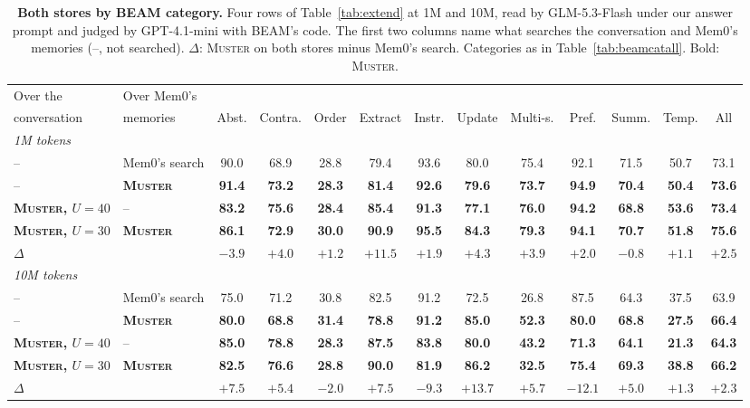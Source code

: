 \documentclass{article}
\newcommand{\ours}{\rowcolor{oursbg}}
\newcommand{\tabfont}{\fontsize{7.5}{8.5}\selectfont\renewcommand{\arraystretch}{1.0}}
\newcommand{\sys}{\textsc{Muster}}
\begin{document}
\begin{table}[H]
\centering\tabfont
\caption{\textbf{Both stores by BEAM category.} Four rows of Table~\ref{tab:extend} at 1M and 10M, read by GLM-5.3-Flash under our answer prompt and judged by GPT-4.1-mini with BEAM's code. The first two columns name what searches the conversation and Mem0's memories (--, not searched). $\Delta$: \sys{} on both stores minus Mem0's search. Categories as in Table~\ref{tab:beamcatall}. Bold: \sys{}.}
\label{tab:beamcatboth}
\setlength{\tabcolsep}{2.6pt}
\begin{tabular}{llccccccccccc}
\toprule
Over the & Over Mem0's & & & & & & & & & & & \\
conversation & memories & Abst. & Contra. & Order & Extract & Instr. & Update & Multi-s. & Pref. & Summ. & Temp. & All \\
\midrule
\multicolumn{13}{l}{\emph{1M tokens}}\\
-- & Mem0's search & 90.0 & 68.9 & 28.8 & 79.4 & 93.6 & 80.0 & 75.4 & 92.1 & 71.5 & 50.7 & 73.1 \\
\ours -- & \textbf{\sys{}} & \textbf{91.4} & \textbf{73.2} & \textbf{28.3} & \textbf{81.4} & \textbf{92.6} & \textbf{79.6} & \textbf{73.7} & \textbf{94.9} & \textbf{70.4} & \textbf{50.4} & \textbf{73.6} \\
\ours \textbf{\sys{}, $U{=}40$} & -- & \textbf{83.2} & \textbf{75.6} & \textbf{28.4} & \textbf{85.4} & \textbf{91.3} & \textbf{77.1} & \textbf{76.0} & \textbf{94.2} & \textbf{68.8} & \textbf{53.6} & \textbf{73.4} \\
\ours \textbf{\sys{}, $U{=}30$} & \textbf{\sys{}} & \textbf{86.1} & \textbf{72.9} & \textbf{30.0} & \textbf{90.9} & \textbf{95.5} & \textbf{84.3} & \textbf{79.3} & \textbf{94.1} & \textbf{70.7} & \textbf{51.8} & \textbf{75.6} \\
\multicolumn{2}{l}{\quad $\Delta$} & $-3.9$ & $+4.0$ & $+1.2$ & $+11.5$ & $+1.9$ & $+4.3$ & $+3.9$ & $+2.0$ & $-0.8$ & $+1.1$ & $+2.5$ \\
\midrule
\multicolumn{13}{l}{\emph{10M tokens}}\\
-- & Mem0's search & 75.0 & 71.2 & 30.8 & 82.5 & 91.2 & 72.5 & 26.8 & 87.5 & 64.3 & 37.5 & 63.9 \\
\ours -- & \textbf{\sys{}} & \textbf{80.0} & \textbf{68.8} & \textbf{31.4} & \textbf{78.8} & \textbf{91.2} & \textbf{85.0} & \textbf{52.3} & \textbf{80.0} & \textbf{68.8} & \textbf{27.5} & \textbf{66.4} \\
\ours \textbf{\sys{}, $U{=}40$} & -- & \textbf{85.0} & \textbf{78.8} & \textbf{28.3} & \textbf{87.5} & \textbf{83.8} & \textbf{80.0} & \textbf{43.2} & \textbf{71.3} & \textbf{64.1} & \textbf{21.3} & \textbf{64.3} \\
\ours \textbf{\sys{}, $U{=}30$} & \textbf{\sys{}} & \textbf{82.5} & \textbf{76.6} & \textbf{28.8} & \textbf{90.0} & \textbf{81.9} & \textbf{86.2} & \textbf{32.5} & \textbf{75.4} & \textbf{69.3} & \textbf{38.8} & \textbf{66.2} \\
\multicolumn{2}{l}{\quad $\Delta$} & $+7.5$ & $+5.4$ & $-2.0$ & $+7.5$ & $-9.3$ & $+13.7$ & $+5.7$ & $-12.1$ & $+5.0$ & $+1.3$ & $+2.3$ \\
\bottomrule
\end{tabular}
\end{table}
\end{document}
